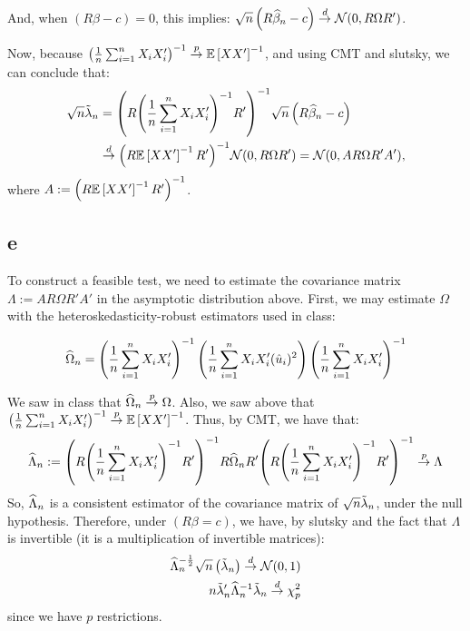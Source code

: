 \documentclass[12pt]{paper}
\begin{document}
And, when $\left(  R \beta - c \right) = 0$, this implies: $\sqrt{n} \left(  R\widehat{ \beta }_{n}-c\right)\overset{d}{\to} \mathcal{N}( 0, R\Omega R')$.

Now, because ${\left( \frac{1}{n} \sum_{i=1}^n X_i X_i'  \right)}^{-1}\overset{p}{\to}\mathbb{E} \left [ XX' \right ]^{-1}$, and using CMT and slutsky, we can conclude that:
\begin{align*}
  \sqrt{n}\tilde{ \lambda }_{n}&={ \left( R { \left( \frac{1}{n} \sum_{i=1}^n X_i
               X_i' \right)}^{-1} R' \right)}^{-1}\sqrt{n} \left(  R \widehat{ \beta }_{n} - c \right)\\
               & \overset{d}{\to} { \left( R\mathbb{E} \left [ XX' \right ]^{-1}R' \right)}^{-1}\mathcal{N}( 0, R\Omega R')=\mathcal{N}( 0,A R\Omega R'A'),\\
\end{align*}
where $A:={ \left( R\mathbb{E} \left [ XX' \right ]^{-1}R' \right)}^{-1}$.

\subsection*{e}

To construct a feasible test, we need to estimate the covariance matrix $\Lambda:=A R\Omega R'A'$ in the asymptotic distribution above. First, we may estimate $\Omega$ with the
heteroskedasticity-robust estimators used in class: 

\begin{equation*}
  \widehat{ \Omega }_{n} = {\left( \frac{1}{n}\sum_{i=1}^n X_i X_i' \right)}^{-1}
  \left( \frac{1}{n}\sum_{i=1}^n X_i X_i' (\hat{u}_i)^2 \right)
  {\left( \frac{1}{n}\sum_{i=1}^n X_i X_i' \right)}^{-1}
\end{equation*}

We saw in class that $\widehat{ \Omega }_{n} \overset{p}{\to} \Omega$. Also, we saw above that  ${\left( \frac{1}{n} \sum_{i=1}^n X_i X_i'  \right)}^{-1}\overset{p}{\to}\mathbb{E} \left [ XX' \right ]^{-1}$. Thus, by CMT, we have that:
\begin{equation*}
  \widehat{ \Lambda }_{n} := { \left( R { \left( \frac{1}{n} \sum_{i=1}^n X_i
               X_i' \right)}^{-1} R' \right)}^{-1}R\widehat{ \Omega }_{n}R'{ \left( R { \left( \frac{1}{n} \sum_{i=1}^n X_i
               X_i' \right)}^{-1} R' \right)}^{-1}\overset{p}{\to} \Lambda
\end{equation*}
So, $\widehat{ \Lambda }_{n}$ is a consistent estimator of the covariance matrix of $\sqrt{n} \tilde{ \lambda }_{n}$, under the null hypothesis. Therefore, under $(R\beta=c)$, we have, by slutsky and the fact that $\Lambda$ is invertible (it is a multiplication of invertible matrices):
\begin{align*}
  \widehat{ \Lambda }_{n}^{-\frac{1}{2}} \sqrt{n} \left(  \tilde{ \lambda }_{n} \right) \overset{d}{\to} \mathcal{N}( 0,
  1 )\\
  n \tilde{ \lambda }_{n}' {\widehat{ \Lambda }_{n}}^{-1} \tilde{ \lambda }_{n}
  \overset{d}{\to} \chi_p^2 \\
\end{align*}
since we have $p$ restrictions.
\end{document}
